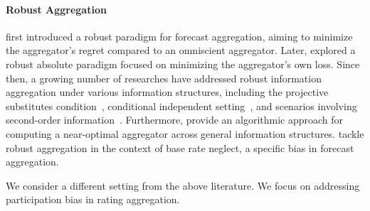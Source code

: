 \paragraph{Robust Aggregation}
\citet{arieli2018robust} first introduced a robust paradigm for forecast aggregation, aiming to minimize the aggregator's regret compared to an omniscient aggregator. Later, \citet{de2021robust} explored a robust absolute paradigm focused on minimizing the aggregator's own loss. Since then, a growing number of researches have addressed robust information aggregation under various information structures, including the projective substitutes condition~\citep{neyman2022you}, conditional independent setting~\citep{arieli2018robust}, and scenarios involving second-order information~\citep{pan2023robust}. Furthermore, \citet{guo2024algorithmic} provide an algorithmic approach for computing a near-optimal aggregator across general information structures. \citet{kong2024surprising} tackle robust aggregation in the context of base rate neglect, a specific bias in forecast aggregation.

We consider a different setting from the above literature. We focus on addressing participation bias in rating aggregation.



